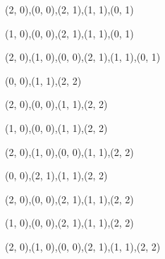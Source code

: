 \begin{figure}
\begin{subfigure}[b]{0.14\textwidth}
{       {{(2, 0),(0, 0),(2, 1),(1, 1),(0, 1)}} {{}}
    }
  \end{subfigure}
  \begin{subfigure}[b]{0.14\textwidth}
    \resizebox{\linewidth}{!} {
       {{(1, 0),(0, 0),(2, 1),(1, 1),(0, 1)}} {{}}
    }
  \end{subfigure}
  \begin{subfigure}[b]{0.14\textwidth}
    \resizebox{\linewidth}{!} {
       {{(2, 0),(1, 0),(0, 0),(2, 1),(1, 1),(0, 1)}} {{}}
    }
  \end{subfigure}
  \begin{subfigure}[b]{0.14\textwidth}
    \resizebox{\linewidth}{!} {
       {{(0, 0),(1, 1),(2, 2)}} {{}}
    }
  \end{subfigure}
  \begin{subfigure}[b]{0.14\textwidth}
    \resizebox{\linewidth}{!} {
       {{(2, 0),(0, 0),(1, 1),(2, 2)}} {{}}
    }
  \end{subfigure}
  \begin{subfigure}[b]{0.14\textwidth}
    \resizebox{\linewidth}{!} {
       {{(1, 0),(0, 0),(1, 1),(2, 2)}} {{}}
    }
  \end{subfigure}
  \begin{subfigure}[b]{0.14\textwidth}
    \resizebox{\linewidth}{!} {
       {{(2, 0),(1, 0),(0, 0),(1, 1),(2, 2)}} {{}}
    }
  \end{subfigure}
  \begin{subfigure}[b]{0.14\textwidth}
    \resizebox{\linewidth}{!} {
       {{(0, 0),(2, 1),(1, 1),(2, 2)}} {{}}
    }
  \end{subfigure}
  \begin{subfigure}[b]{0.14\textwidth}
    \resizebox{\linewidth}{!} {
       {{(2, 0),(0, 0),(2, 1),(1, 1),(2, 2)}} {{}}
    }
  \end{subfigure}
  \begin{subfigure}[b]{0.14\textwidth}
    \resizebox{\linewidth}{!} {
       {{(1, 0),(0, 0),(2, 1),(1, 1),(2, 2)}} {{}}
    }
  \end{subfigure}
  \begin{subfigure}[b]{0.14\textwidth}
    \resizebox{\linewidth}{!} {
       {{(2, 0),(1, 0),(0, 0),(2, 1),(1, 1),(2, 2)}} {{}}
    }
  \end{subfigure}
  \begin{subfigure}[b]{0.14\textwidth}

\end{subfigure}
\end{figure}

